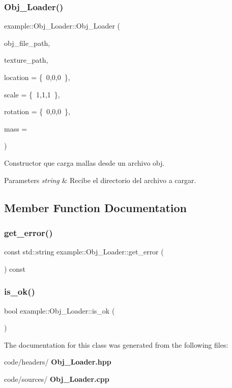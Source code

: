 \subsubsection{Obj\_Loader()}
{\footnotesize\ttfamily example\+::\+Obj\+\_\+\+Loader\+::\+Obj\+\_\+\+Loader (\begin{DoxyParamCaption}\item[{const std\+::string \&}]{obj\+\_\+file\+\_\+path,  }\item[{const string \&}]{texture\+\_\+path,  }\item[{glm\+::vec3}]{location = {\ttfamily \{~0,0,0~\}},  }\item[{glm\+::vec3}]{scale = {\ttfamily \{~1,1,1~\}},  }\item[{glm\+::vec3}]{rotation = {\ttfamily \{~0,0,0~\}},  }\item[{float}]{mass = {} }\end{DoxyParamCaption})}

Constructor que carga mallas desde un archivo obj. 
\begin{DoxyParams}{Parameters}
{\em string} & Recibe el directorio del archivo a cargar. \\
\hline
\end{DoxyParams}


\subsection{Member Function Documentation}
\mbox{\label{classexample_1_1_obj___loader_a37213a3e6a9b9027ae2fc7a4ab67389c}} 
\subsubsection{get\_error()}
{\footnotesize\ttfamily const std\+::string example\+::\+Obj\+\_\+\+Loader\+::get\+\_\+error (\begin{DoxyParamCaption}{ }\end{DoxyParamCaption}) const\hspace{0.3cm}{\ttfamily [inline]}}

\mbox{\label{classexample_1_1_obj___loader_a695486f95632d16e5c2955d889a53b20}} 
\subsubsection{is\_ok()}
{\footnotesize\ttfamily bool example\+::\+Obj\+\_\+\+Loader\+::is\+\_\+ok (\begin{DoxyParamCaption}{ }\end{DoxyParamCaption})\hspace{0.3cm}{\ttfamily [inline]}}



The documentation for this class was generated from the following files\+:\begin{DoxyCompactItemize}
\item 
code/headers/\textbf{ Obj\+\_\+\+Loader.\+hpp}\item 
code/sources/\textbf{ Obj\+\_\+\+Loader.\+cpp}\end{DoxyCompactItemize}
